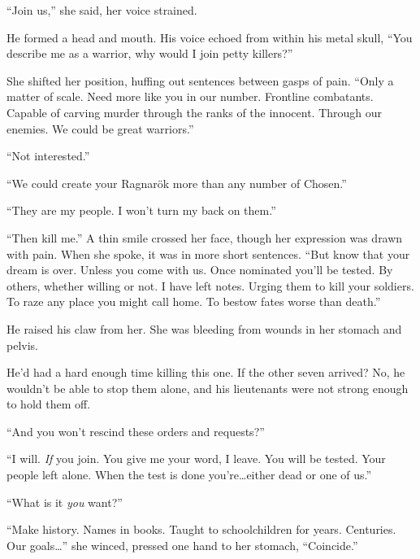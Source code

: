 ``Join us,'' she said, her voice strained.



He formed a head and mouth.  His voice echoed from within his metal skull, ``You describe me as a warrior, why would I join petty killers?''



She shifted her position, huffing out sentences between gasps of pain.  ``Only a matter of scale.   Need more like you in our number.  Frontline combatants.  Capable of carving murder through the ranks of the innocent.  Through our enemies.  We could be great warriors.''



``Not interested.''



``We could create your Ragnar\"{o}k more than any number of Chosen.''



``They are my people.  I won't turn my back on them.''



``Then kill me.''  A thin smile crossed her face, though her expression was drawn with pain.  When she spoke, it was in more short sentences. ``But know that your dream is over.  Unless you come with us.  Once nominated you'll be tested.  By others, whether willing or not.  I have left notes.  Urging them to kill your soldiers.  To raze any place you might call home.  To bestow fates worse than death.''



He raised his claw from her.  She was bleeding from wounds in her stomach and pelvis.



He'd had a hard enough time killing this one.  If the other seven arrived?  No, he wouldn't be able to stop them alone, and his lieutenants were not strong enough to hold them off.



``And you won't rescind these orders and requests?''



``I will.  \emph{If} you join.  You give me your word, I leave.  You will be tested.  Your people left alone.  When the test is done you're\ldots either dead or one of us.''



``What is it \emph{you} want?''



``Make history.  Names in books.  Taught to schoolchildren for years.  Centuries.  Our goals\ldots'' she winced, pressed one hand to her stomach, ``Coincide.''



